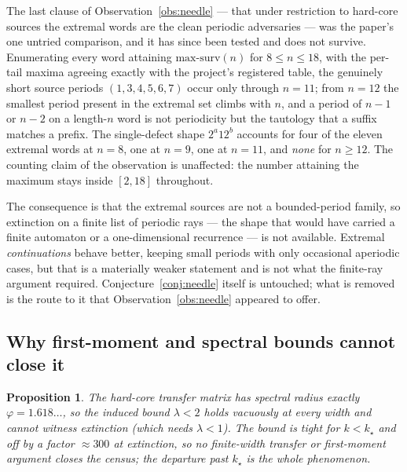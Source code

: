 \documentclass[11pt]{article}
\newtheorem{proposition}[theorem]{Proposition}
\theoremstyle{definition}
\begin{document}
The last clause of Observation~\ref{obs:needle} --- that under restriction to
hard-core sources the extremal words are the clean periodic adversaries --- was
the paper's one untried comparison, and it has since been tested and does not
survive. Enumerating every word attaining $\mathrm{max\text{-}surv}(n)$ for
$8\le n\le18$, with the per-tail maxima agreeing exactly with the project's
registered table, the genuinely short source periods $(1,3,4,5,6,7)$ occur only
through $n=11$; from $n=12$ the smallest period present in the extremal set
climbs with $n$, and a period of $n-1$ or $n-2$ on a length-$n$ word is not
periodicity but the tautology that a suffix matches a prefix. The single-defect
shape $2^a12^b$ accounts for four of the eleven extremal words at $n=8$, one at
$n=9$, one at $n=11$, and \emph{none} for $n\ge12$. The counting claim of the
observation is unaffected: the number attaining the maximum stays inside
$[2,18]$ throughout.

The consequence is that the extremal sources are not a bounded-period family,
so extinction on a finite list of periodic rays --- the shape that would have
carried a finite automaton or a one-dimensional recurrence --- is not available.
Extremal \emph{continuations} behave better, keeping small periods with only
occasional aperiodic cases, but that is a materially weaker statement and is not
what the finite-ray argument required. Conjecture~\ref{conj:needle} itself is
untouched; what is removed is the route to it that Observation~\ref{obs:needle}
appeared to offer.

\subsection{Why first-moment and spectral bounds cannot close it}

\begin{proposition}\label{prop:spectral}
The hard-core transfer matrix has spectral radius exactly $\varphi=1.618\ldots$,
so the induced bound $\lambda<2$ holds vacuously at every width and cannot
witness extinction (which needs $\lambda<1$). The bound is tight for $k<k_\star$
and off by a factor $\approx300$ at extinction, so no finite-width transfer or
first-moment argument closes the census; the departure past $k_\star$ is the
whole phenomenon.
\end{proposition}
\end{document}

